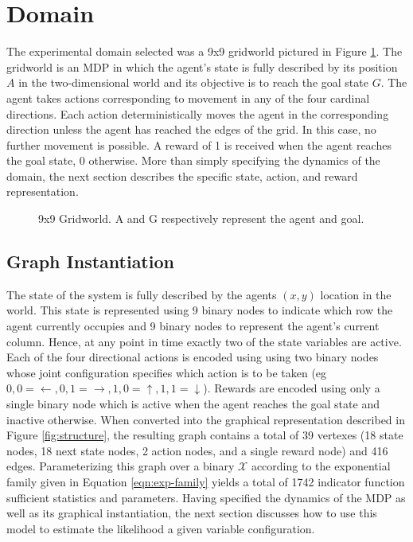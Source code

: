 \documentclass{article} %
\begin{document}
\section{Domain}
The experimental domain selected was a 9x9 gridworld pictured in Figure
\ref{fig:gridworld}. The gridworld is an MDP in which the agent's state is
fully described by its position $A$ in the two-dimensional world and its
objective is to reach the goal state $G$. The agent takes actions corresponding
to movement in any of the four cardinal directions. Each action
deterministically moves the agent in the corresponding direction unless the
agent has reached the edges of the grid. In this case, no further movement is
possible. A reward of 1 is received when the agent reaches the goal state, 0
otherwise. More than simply specifying the dynamics of the domain, the next
section describes the specific state, action, and reward representation.

\begin{figure}
\center
{}
\caption{9x9 Gridworld. A and G respectively represent the agent and goal.}
\label{fig:gridworld}
\end{figure}

\subsection{Graph Instantiation}
The state of the system is fully described by the agents $(x,y)$ location in
the world. This state is represented using 9 binary nodes to indicate which row
the agent currently occupies and 9 binary nodes to represent the agent's
current column. Hence, at any point in time exactly two of the state variables
are active. Each of the four directional actions is encoded using using two
binary nodes whose joint configuration specifies which action is to be taken
(eg $0,0=\leftarrow, 0,1=\rightarrow, 1,0=\uparrow, 1,1=\downarrow$). Rewards
are encoded using only a single binary node which is active when the agent
reaches the goal state and inactive otherwise. When converted into the
graphical representation described in Figure \ref{fig:structure}, the resulting
graph contains a total of 39 vertexes (18 state nodes, 18 next state nodes, 2
action nodes, and a single reward node) and 416 edges. Parameterizing this
graph over a binary $\mathcal{X}$ according to the exponential family given in
Equation \ref{eqn:exp-family} yields a total of 1742 indicator function
sufficient statistics and parameters. Having specified the dynamics of the MDP
as well as its graphical instantiation, the next section discusses how to use
this model to estimate the likelihood a given variable configuration.
\end{document}
